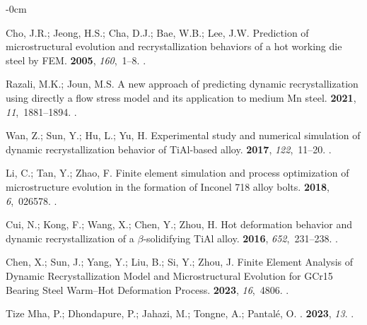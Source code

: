 \documentclass[metals,article,accept,pdftex,moreauthors]{Definitions/mdpi}
\begin{document}
\begin{adjustwidth}{-\extralength}{0cm}
\begin{thebibliography}{999}
Cho, J.R.; Jeong, H.S.; Cha, D.J.; Bae, W.B.; Lee, J.W.
\newblock Prediction of microstructural evolution and recrystallization
  behaviors of a hot working die steel by FEM.
 {\bf 2005}, {\em
  160},~1--8.
.

Razali, M.K.; Joun, M.S.
\newblock A new approach of predicting dynamic recrystallization using directly
  a flow stress model and its application to medium Mn steel.
 {\bf 2021}, {\em
  11},~1881--1894.
.

Wan, Z.; Sun, Y.; Hu, L.; Yu, H.
\newblock Experimental study and numerical simulation of dynamic
  recrystallization behavior of TiAl-based alloy.
 {\bf 2017}, {\em 122},~11--20.
.

Li, C.; Tan, Y.; Zhao, F.
\newblock Finite element simulation and process optimization of microstructure
  evolution in the formation of Inconel 718 alloy bolts.
 {\bf 2018}, {\em 6},~026578.
.

Cui, N.; Kong, F.; Wang, X.; Chen, Y.; Zhou, H.
\newblock Hot deformation behavior and dynamic recrystallization of a
  $\beta$-solidifying TiAl alloy.
 {\bf 2016}, {\em
  652},~231--238.
.

Chen, X.; Sun, J.; Yang, Y.; Liu, B.; Si, Y.; Zhou, J.
\newblock Finite Element Analysis of Dynamic Recrystallization Model and
  Microstructural Evolution for GCr15 Bearing Steel Warm--Hot Deformation
  Process.
 {\bf 2023}, {\em 16},~4806.
.

{Tize Mha}, P.; Dhondapure, P.; Jahazi, M.; Tongne, A.; Pantalé, O.
.
 {\bf 2023}, {\em 13}.
.


\end{thebibliography}
\end{adjustwidth}
\end{document}
